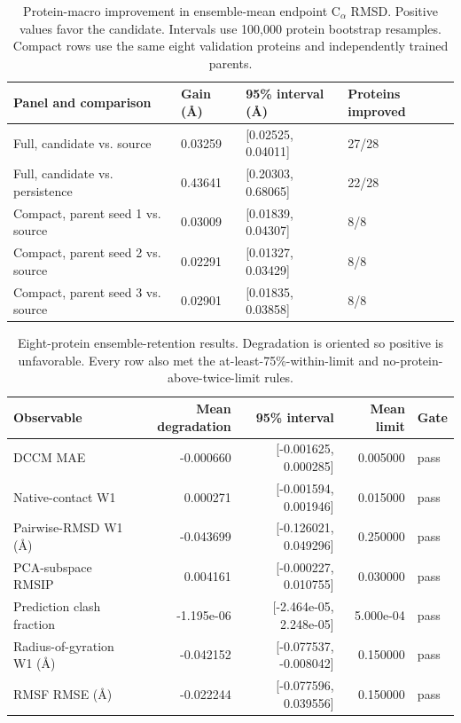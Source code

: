 \documentclass{article}
\newcommand{\CA}{C$_\alpha$}
\begin{document}
\begin{table}
  \caption{Protein-macro improvement in ensemble-mean endpoint \CA{} RMSD. Positive values favor the candidate. Intervals use 100,000 protein bootstrap resamples. Compact rows use the same eight validation proteins and independently trained parents.}
  \label{tab:endpoint}
  \centering
  \small
  \begin{tabular}{llll}
    \toprule
    Panel and comparison               & Gain (\AA) & 95\% interval (\AA) & Proteins improved \\
    \midrule
    Full, candidate vs. source         & 0.03259 & [0.02525, 0.04011] & 27/28 \\
    Full, candidate vs. persistence    & 0.43641 & [0.20303, 0.68065] & 22/28 \\
    Compact, parent seed 1 vs. source  & 0.03009 & [0.01839, 0.04307] & 8/8 \\
    Compact, parent seed 2 vs. source  & 0.02291 & [0.01327, 0.03429] & 8/8 \\
    Compact, parent seed 3 vs. source  & 0.02901 & [0.01835, 0.03858] & 8/8 \\
    \bottomrule
  \end{tabular}
\end{table}

\begin{table}
  \caption{Eight-protein ensemble-retention results. Degradation is oriented so positive is unfavorable. Every row also met the at-least-75\%-within-limit and no-protein-above-twice-limit rules.}
  \label{tab:retention}
  \centering
  \scriptsize
  \begin{tabular}{lrrrl}
    \toprule
    Observable & Mean degradation & 95\% interval & Mean limit & Gate \\
    \midrule
    DCCM MAE                  & -0.000660  & [-0.001625, 0.000285]  & 0.005000  & pass \\
    Native-contact W1         & 0.000271   & [-0.001594, 0.001946]  & 0.015000  & pass \\
    Pairwise-RMSD W1 (\AA)    & -0.043699  & [-0.126021, 0.049296]  & 0.250000  & pass \\
    PCA-subspace RMSIP        & 0.004161   & [-0.000227, 0.010755]  & 0.030000  & pass \\
    Prediction clash fraction & -1.195e-06 & [-2.464e-05, 2.248e-05] & 5.000e-04 & pass \\
    Radius-of-gyration W1 (\AA) & -0.042152 & [-0.077537, -0.008042] & 0.150000  & pass \\
    RMSF RMSE (\AA)           & -0.022244  & [-0.077596, 0.039556]  & 0.150000  & pass \\
    \bottomrule
  \end{tabular}
\end{table}
\end{document}
